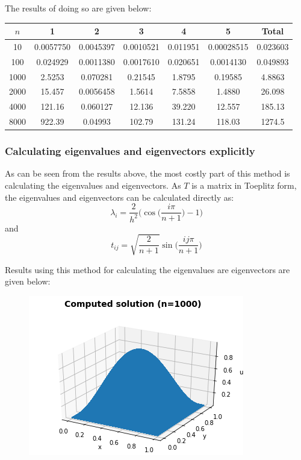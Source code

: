 \documentclass{article}
\numberwithin{equation}{section}
\begin{document}
The results of doing so are given below:

\begin{table}[H]
\centering
\begin{tabular}{|c|c|c|c|c|c|c|}
\hline
$n$ & 1 & 2 & 3 & 4 & 5 & Total \\
\hline
10 & 0.0057750 & 0.0045397 & 0.0010521 & 0.011951 & 0.00028515 & 0.023603 \\
100 & 0.024929 & 0.0011380 & 0.0017610 & 0.020651 & 0.0014130 & 0.049893 \\
1000 & 2.5253 & 0.070281 & 0.21545 & 1.8795 & 0.19585 & 4.8863 \\
2000 & 15.457 & 0.0056458 & 1.5614 & 7.5858 & 1.4880 & 26.098 \\
4000 & 121.16 & 0.060127 & 12.136 & 39.220 & 12.557 & 185.13 \\
8000 & 922.39 & 0.04993 & 102.79 & 131.24 & 118.03 & 1274.5  \\
\hline
\end{tabular}
\end{table}

\subsubsection*{Calculating eigenvalues and eigenvectors explicitly}

As can be seen from the results above, the most costly part of this method is calculating the eigenvalues and eigenvectors. As $T$ is a matrix in Toeplitz form, the eigenvalues and eigenvectors can be calculated directly as:
\[ \lambda_i = \frac{2}{h^2} \Big( \cos \Big( \frac{i \pi}{n+1} \Big) - 1 \Big) \]
and 
\[ t_{ij} = \sqrt{\frac{2}{n+1}} \sin \Big( \frac{ij \pi}{n+1}  \Big) \]

Results using this method for calculating the eigenvalues are eigenvectors are given below:

\begin{figure}[H]
\includegraphics[scale=.7]{img/U_trans2.png}
\centering
\end{figure}
\end{document}
